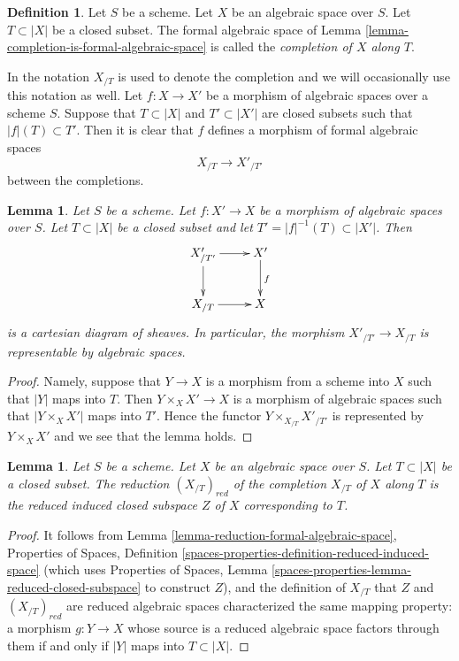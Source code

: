 \documentclass{stacks-project}
\theoremstyle{plain}
\newtheorem{lemma}[subsection]{Lemma}
\theoremstyle{definition}
\newtheorem{definition}[subsection]{Definition}
\theoremstyle{remark}
\numberwithin{equation}{subsection}
\begin{document}
\begin{definition}
\label{definition-completion}
Let $S$ be a scheme. Let $X$ be an algebraic space over $S$.
Let $T \subset |X|$ be a closed subset. The formal algebraic space
of Lemma \ref{lemma-completion-is-formal-algebraic-space}
is called the {\it completion of $X$ along $T$}.
\end{definition}

\noindent
In \cite[Chapter I, Section 10.8]{EGA} the notation $X_{/T}$
is used to denote the completion and we will occasionally use
this notation as well. Let $f : X \to X'$ be
a morphism of algebraic spaces over a scheme $S$. Suppose
that $T \subset |X|$ and $T' \subset |X'|$ are closed subsets
such that $|f|(T) \subset T'$. Then it is clear that
$f$ defines a morphism of formal algebraic spaces
$$
X_{/T} \longrightarrow X'_{/T'}
$$
between the completions.

\begin{lemma}
\label{lemma-map-completions-representable}
Let $S$ be a scheme. Let $f : X' \to X$ be a morphism
of algebraic spaces over $S$. Let $T \subset |X|$
be a closed subset and let $T' = |f|^{-1}(T) \subset |X'|$.
Then
$$
\xymatrix{
X'_{/T'} \ar[r] \ar[d] & X' \ar[d]^f \\
X_{/T} \ar[r] & X
}
$$
is a cartesian diagram of sheaves. In particular, the morphism
$X'_{/T'} \to X_{/T}$ is representable by algebraic spaces.
\end{lemma}

\begin{proof}
Namely, suppose that $Y \to X$ is a morphism from a scheme into $X$ such
that $|Y|$ maps into $T$. Then $Y \times_X X' \to X$ is a morphism of
algebraic spaces such that $|Y \times_X X'|$ maps into $T'$. Hence the
functor $Y \times_{X_{/T}} X'_{/T'}$ is represented by $Y \times_X X'$
and we see that the lemma holds.
\end{proof}

\begin{lemma}
\label{lemma-reduction-completion}
Let $S$ be a scheme. Let $X$ be an algebraic space over $S$.
Let $T \subset |X|$ be a closed subset. The reduction $(X_{/T})_{red}$
of the completion $X_{/T}$ of $X$ along $T$ is
the reduced induced closed subspace $Z$ of $X$ corresponding to $T$.
\end{lemma}

\begin{proof}
It follows from Lemma \ref{lemma-reduction-formal-algebraic-space},
Properties of Spaces, Definition
\ref{spaces-properties-definition-reduced-induced-space}
(which uses Properties of Spaces, Lemma
\ref{spaces-properties-lemma-reduced-closed-subspace} to construct $Z$),
and the definition of $X_{/T}$ that
$Z$ and $(X_{/T})_{red}$ are reduced algebraic spaces
characterized the same mapping property:
a morphism $g : Y \to X$ whose source is a reduced algebraic space
factors through them if and only if $|Y|$ maps into $T \subset |X|$.
\end{proof}
\end{document}
